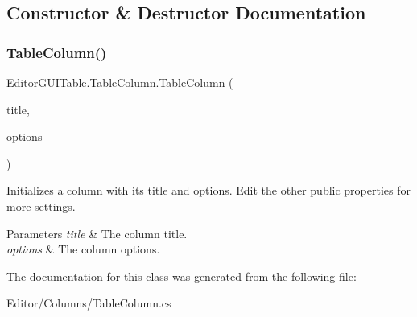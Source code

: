\subsection{Constructor \& Destructor Documentation}
\mbox{\label{class_editor_g_u_i_table_1_1_table_column_adfb68a7994e1329ac769c79d9d5c332d}} 
\subsubsection{\texorpdfstring{Table\+Column()}{TableColumn()}}
{\footnotesize\ttfamily Editor\+G\+U\+I\+Table.\+Table\+Column.\+Table\+Column (\begin{DoxyParamCaption}\item[{string}]{title,  }\item[{params \mbox{\hyperlink{class_table_column_option}{Table\+Column\+Option}} \mbox{[}$\,$\mbox{]}}]{options }\end{DoxyParamCaption})\hspace{0.3cm}{\ttfamily [inline]}}



Initializes a column with its title and options. Edit the other public properties for more settings. 


\begin{DoxyParams}{Parameters}
{\em title} & The column title.\\
\hline
{\em options} & The column options.\\
\hline
\end{DoxyParams}


The documentation for this class was generated from the following file\+:\begin{DoxyCompactItemize}
\item 
Editor/\+Columns/Table\+Column.\+cs\end{DoxyCompactItemize}
